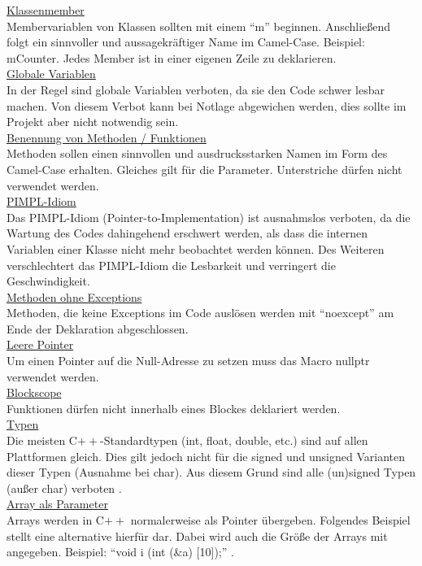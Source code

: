 \underline{Klassenmember}\\
Membervariablen von Klassen sollten mit einem "`m"' beginnen. Anschließend folgt ein sinnvoller und aussagekräftiger Name im Camel-Case. Beispiel: mCounter. Jedes Member ist in einer eigenen Zeile zu deklarieren. \bigskip \\
\underline{Globale Variablen}\\
In der Regel sind globale Variablen verboten, da sie den Code schwer lesbar machen. Von diesem Verbot kann bei Notlage abgewichen werden, dies sollte im Projekt aber nicht notwendig sein.\bigskip \\
\underline{Benennung von Methoden / Funktionen}\\
Methoden sollen einen sinnvollen und ausdrucksstarken Namen im Form des Camel-Case erhalten. Gleiches gilt für die Parameter. Unterstriche dürfen nicht verwendet werden.\bigskip \\
\underline{PIMPL-Idiom}\\
Das PIMPL-Idiom (Pointer-to-Implementation) ist ausnahmslos verboten, da die Wartung des Codes dahingehend erschwert werden, als dass die internen Variablen einer Klasse nicht mehr beobachtet werden können. Des Weiteren verschlechtert das PIMPL-Idiom die Lesbarkeit und verringert die Geschwindigkeit.\bigskip \\
\underline{Methoden ohne Exceptions}\\
Methoden, die keine Exceptions im Code auslösen werden mit "`noexcept"' am Ende der Deklaration abgeschlossen.\bigskip \\
\underline{Leere Pointer}\\
Um einen Pointer auf die Null-Adresse zu setzen muss das Macro nullptr verwendet werden.\bigskip \\
\underline{Blockscope}\\
Funktionen dürfen nicht innerhalb eines Blockes deklariert werden.\bigskip \\
\underline{Typen}\\
Die meisten C$++$-Standardtypen (int, float, double, etc.) sind auf allen Plattformen gleich. Dies gilt jedoch nicht für die signed und unsigned Varianten dieser Typen (Ausnahme bei char). Aus diesem Grund sind alle (un)signed Typen (außer char) verboten \cite[vgl.][]{HIC_1}.\bigskip \\
\underline{Array als Parameter}\\
Arrays werden in C$++$ normalerweise als Pointer übergeben. Folgendes Beispiel stellt eine alternative hierfür dar. Dabei wird auch die Größe der Arrays mit angegeben. Beispiel: "`void i (int (\&a) [10]);"' \cite[vgl.][]{HIC_2}.\bigskip \\
